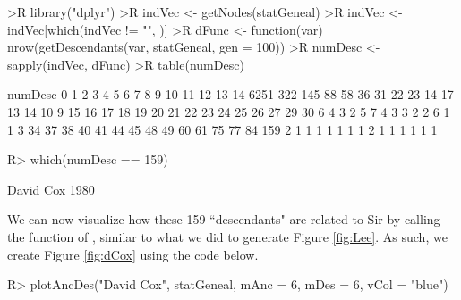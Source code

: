 \documentclass[article,shortnames]{jss}
\begin{document}
\begin{CodeChunk}
\begin{CodeInput}
>R library("dplyr")
>R indVec <- getNodes(statGeneal)
>R indVec <- indVec[which(indVec != "", )]
>R dFunc <- function(var) nrow(getDescendants(var, statGeneal, gen = 100))
>R numDesc <- sapply(indVec, dFunc)
>R table(numDesc)
\end{CodeInput}
\begin{CodeOutput}
numDesc
   0    1    2    3    4    5    6    7    8    9   10   11   12   13   14 
6251  322  145   88   58   36   31   22   23   14   17   13   14   10    9 
  15   16   17   18   19   20   21   22   23   24   25   26   27   29   30 
   6    4    3    2    5    7    4    3    3    2    2    6    1    1    3 
  34   37   38   40   41   44   45   48   49   60   61   75   77   84  159 
   2    1    1    1    1    1    1    1    2    1    1    1    1    1    1 
\end{CodeOutput}
\begin{CodeInput}
R> which(numDesc == 159)
\end{CodeInput}
\begin{CodeOutput}
David Cox 
     1980
\end{CodeOutput}
\end{CodeChunk}

We can now visualize how these 159 ``descendants" are related to Sir  by calling the  function of , similar to what we did to generate Figure \ref{fig:Lee}. As such, we create Figure \ref{fig:dCox} using the code below.

\begin{CodeInput}
R> plotAncDes("David Cox", statGeneal, mAnc = 6, mDes = 6, vCol = "blue")
\end{CodeInput}
\end{document}
